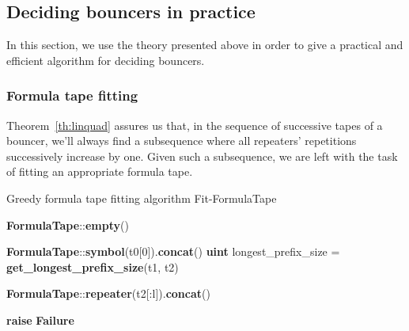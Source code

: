 \subsection{Deciding bouncers in practice}\label{sec:bouncers-algo}

In this section, we use the theory presented above in order to give a practical and efficient algorithm for deciding bouncers.

\subsubsection{Formula tape fitting}

Theorem~\ref{th:linquad} assures us that, in the sequence of successive tapes of a bouncer, we'll always find a subsequence where all repeaters' repetitions successively increase by one. Given such a subsequence, we are left with the task of fitting an appropriate formula tape.


\begin{algorithm}
    \caption{Greedy formula tape fitting algorithm {\sc Fit-FormulaTape}}\label{alg:greedy-formula-tape-fitting}
    \begin{algorithmic}[1]


        \State \Return \textbf{FormulaTape}::\textbf{empty}()

        \EndIf
        \State
        \State \Return \textbf{FormulaTape}::\textbf{symbol}(t0[0]).\textbf{concat}()
        \EndIf
        \State
        \State
        \textbf{uint} longest\_prefix\_size = \textbf{get\_longest\_prefix\_size}(t1, t2)
        \State

        \State \Return \textbf{FormulaTape}::\textbf{repeater}(t2[:l]).\textbf{concat}()
        \EndIf

        \EndFor
        \State
        \State \textbf{raise} \textbf{Failure}
        \EndProcedure
    \end{algorithmic}
\end{algorithm}

